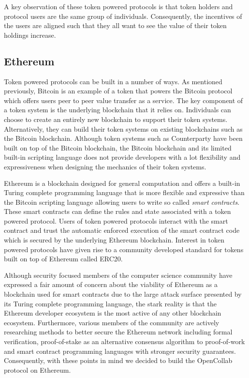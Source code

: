 A key observation of these token powered protocols is that token holders and
protocol users are the same group of individuals. Consequently, the incentives of the users are
aligned such that they all want to see the value of their token holdings increase.

\subsection{Ethereum}

Token powered protocols can be built in a number of ways. As mentioned
previously, Bitcoin is an example of a token that powers the Bitcoin protocol
which offers users peer to peer value transfer as a service. The key
component of a token system is the underlying blockchain that it relies on.
Individuals can choose to create an entirely new blockchain to support their
token systems. Alternatively, they can build their token systems on existing
blockchains such as the Bitcoin blockchain. Although token systems such as
Counterparty have been built on top of the Bitcoin blockchain, the
Bitcoin blockchain and its limited built-in scripting language does not provide developers with a lot flexibility and
expressiveness when designing the mechanics of their token systems\cite{counterparty}.

Ethereum is a blockchain designed for general computation and offers a built-in
Turing complete programming language that is more flexible and expressive than the
Bitcoin scripting language allowing users to write so called \textit{smart
  contracts}\cite{ethereum}. These smart contracts can define the rules and state associated
with a token powered protocol. Users of token powered protocols interact with the smart contract and
trust the automatic enforced execution of the smart contract code which is
secured by the underlying Ethereum blockchain. Interest in token powered protocols have given rise to a community developed
standard for tokens built on top of Ethereum called ERC20\cite{erc20}.

Although security focused members of the computer science community have
expressed a fair amount of concern about the viability of Ethereum as a
blockchain used for smart contracts due to the large attack surface presented by
its Turing complete programming language, the stark reality is that the Ethereum
developer ecosystem is the most active of any other blockchain ecosystem.
Furthermore, various members of the community are actively researching methods
to better secure the Ethereum network including formal verification,
proof-of-stake as an alternative consensus algorithm to proof-of-work and smart
contract programming languages with stronger security guarantees.
Consequently, with these points in mind we decided to build the OpenCollab protocol on Ethereum.

